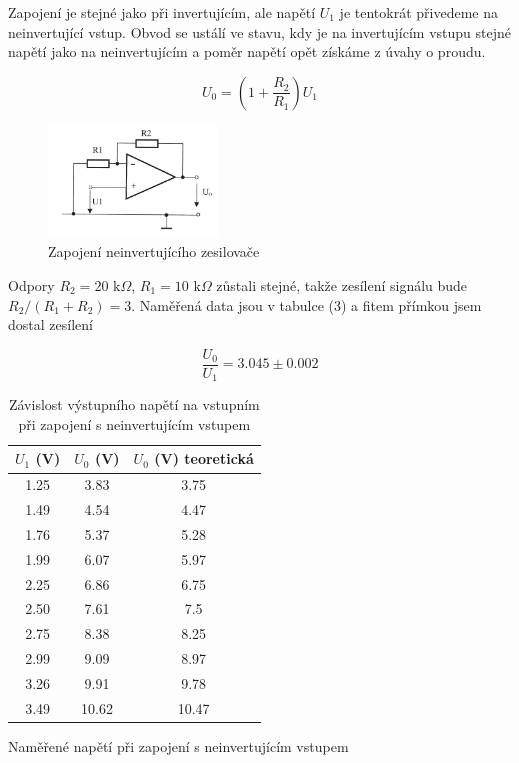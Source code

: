 \documentclass[a4paper,11pt]{article}
\begin{document}
Zapojení je stejné jako při invertujícím, ale napětí $ U_1 $ je tentokrát přivedeme na neinvertující vstup. Obvod se ustálí ve stavu, kdy je na invertujícím vstupu stejné napětí jako na neinvertujícím a poměr napětí opět získáme z úvahy o proudu.

\begin{equation}
U_0 = \left( 1 + \frac{R_2}{R_1} \right) U_1
\end{equation}


\begin{figure}[h]
    \centering
    \includegraphics[width=0.4\textwidth]{neinvertujici_sch.jpg}
    \caption{Zapojení neinvertujícího zesilovače}
\end{figure}

Odpory $ R_2 = 20 \text{ k} \Omega $, $ R_1 = 10 \text{ k} \Omega $ zůstali stejné, takže zesílení signálu bude $ R_2 / (R_1 + R_2) = 3 $. Naměřená data jsou v tabulce (3) a fitem přímkou jsem dostal zesílení

\begin{equation}
\frac{U_0}{U_1} = 3.045 \pm 0.002
\end{equation}

\begin{table}[h]
    \begin{minipage}{.45\linewidth}
    \vspace{-15pt}
    \centering
    \begin{tabular}{| c c c | }
        \hline
        $ U_1 $ (V) & $ U_0 $ (V) & $ U_0 $ (V)  teoretická \\ \hline
       1.25 & 3.83  &  3.75  \\
       1.49 & 4.54  &  4.47  \\
       1.76 & 5.37  &  5.28  \\
       1.99 & 6.07  &  5.97  \\
       2.25 & 6.86  &  6.75  \\
       2.50 & 7.61  &  7.5   \\
       2.75 & 8.38  &  8.25  \\
       2.99 & 9.09  &  8.97  \\
       3.26 & 9.91  &  9.78  \\
       3.49 & 10.62 &  10.47 \\
        \hline
    \end{tabular}
    \caption{Naměřené napětí při zapojení s neinvertujícím vstupem}
    \end{minipage} 
    \hfill
    \begin{minipage}{.5\linewidth}
        \centering
        \resizebox{\textwidth}{!}{  }
        \captionsetup{type=graph}
        \caption{Závislost výstupního napětí na vstupním při zapojení s neinvertujícím vstupem}
    \end{minipage} 
\end{table}
\end{document}
